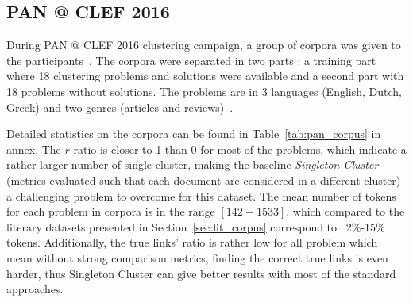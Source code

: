 \subsection{PAN @ CLEF 2016}

During PAN @ CLEF 2016 clustering campaign, a group of corpora was given to the participants~\cite{pan16_corpus}.
The corpora were separated in two parts : a training part where 18 clustering problems and solutions were available and a second part with 18 problems without solutions.
The problems are in 3 languages (English, Dutch, Greek) and two genres (articles and reviews)~\cite{pan16}.

Detailed statistics on the corpora can be found in Table~\ref{tab:pan_corpus} in annex.
The $r$ ratio is closer to 1 than 0 for most of the problems, which indicate a rather larger number of single cluster, making the baseline \textit{Singleton Cluster} (metrics evaluated such that each document are considered in a different cluster) a challenging problem to overcome for this dataset.
The mean number of tokens for each problem in corpora is in the range $[142-1533]$, which compared to the literary datasets presented in Section~\ref{sec:lit_corpus} correspond to ~2\%-15\% tokens.
Additionally, the true links' ratio is rather low for all problem which mean without strong comparison metrics, finding the correct true links is even harder, thus Singleton Cluster can give better results with most of the standard approaches.

